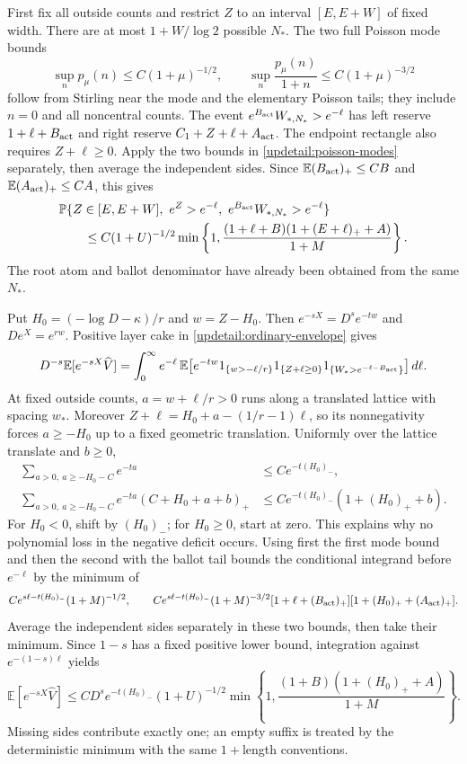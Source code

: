 First fix all outside counts and restrict $Z$ to an interval
$[E,E+W]$ of fixed width. There are at most $1+W/\log2$ possible
$N_*$. The two full Poisson mode bounds
\begin{equation}
 \sup_n p_\mu(n)\leq C(1+\mu)^{-1/2},\qquad
 \sup_n\frac{p_\mu(n)}{1+n}\leq C(1+\mu)^{-3/2}
 \label{updetail:poisson-modes}
\end{equation}
follow from Stirling near the mode and the elementary Poisson tails;
they include $n=0$ and all noncentral counts. The event
$e^{B_{\rm act}}W_{*,N_*}>e^{-\ell}$ has left reserve
$1+\ell+B_{\rm act}$ and right reserve
$C_1+Z+\ell+A_{\rm act}$. The endpoint rectangle also requires
$Z+\ell\geq0$. Apply the two bounds in
\eqref{updetail:poisson-modes} separately, then average the independent
sides. Since $\mathbb E(B_{\rm act})_+\leq CB$ and
$\mathbb E(A_{\rm act})_+\leq CA$, this gives
\begin{align*}
 &\mathbb P\{Z\in[E,E+W],\ e^Z>e^{-\ell},\
                 e^{B_{\rm act}}W_{*,N_*}>e^{-\ell}\}\\
 &\qquad\leq C(1+U)^{-1/2}
 \min\left\{1,\frac{(1+\ell+B)(1+(E+\ell)_++A)}{1+M}\right\}.
\end{align*}
The root atom and ballot denominator have already been obtained
from the same $N_*$.

Put $H_0=(-\log D-\kappa)/r$ and $w=Z-H_0$. Then
$e^{-sX}=D^se^{-tw}$ and $De^X=e^{rw}$. Positive layer cake in
\eqref{updetail:ordinary-envelope} gives
\begin{align*}
 D^{-s}\mathbb E[e^{-sX}\widehat V]
 =\int_0^\infty e^{-\ell}\,
 \mathbb E\big[e^{-tw}1_{\{w>-\ell/r\}}
 1_{\{Z+\ell\geq0\}}
 1_{\{W_*>e^{-\ell-B_{\rm act}}\}}\big]\,d\ell.
\end{align*}
At fixed outside counts, $a=w+\ell/r>0$ runs along a translated
lattice with spacing $w_*$. Moreover
$Z+\ell=H_0+a-(1/r-1)\ell$, so its nonnegativity forces
$a\geq-H_0$ up to a fixed geometric translation. Uniformly over
the lattice translate and $b\geq0$,
\begin{align*}
 \sum_{a>0,\ a\geq-H_0-C}e^{-ta}&\leq Ce^{-t(H_0)_-},\\
 \sum_{a>0,\ a\geq-H_0-C}e^{-ta}(C+H_0+a+b)_+
 &\leq Ce^{-t(H_0)_-}(1+(H_0)_++b).
\end{align*}
For $H_0<0$, shift by $(H_0)_-$; for $H_0\geq0$, start at zero.
This explains why no polynomial loss in the negative deficit occurs.
Using first the first mode bound and then the second with the ballot
tail bounds the conditional integrand before $e^{-\ell}$ by the
minimum of
\[
 Ce^{s\ell-t(H_0)_-}(1+M)^{-1/2},\qquad
 Ce^{s\ell-t(H_0)_-}(1+M)^{-3/2}
 [1+\ell+(B_{\rm act})_+][1+(H_0)_++(A_{\rm act})_+].
\]
Average the independent sides separately in these two bounds, then
take their minimum. Since $1-s$ has a fixed positive lower bound,
integration against $e^{-(1-s)\ell}$ yields
\begin{equation}
 \mathbb E[e^{-sX}\widehat V]
 \leq CD^se^{-t(H_0)_-}(1+U)^{-1/2}
 \min\left\{1,\frac{(1+B)(1+(H_0)_++A)}{1+M}\right\}.
 \label{updetail:joint-root}
\end{equation}
Missing sides contribute exactly one; an empty suffix is treated by
the deterministic minimum with the same $1+$length conventions.


